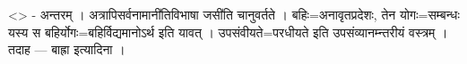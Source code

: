 \textless{}\textgreater{} - अन्तरम् । अत्रापिसर्वनामानी॑तिविभाषा जसी॑ति
चानुवर्तते । बहिः=अनावृतप्रदेशः, तेन योगः=सम्बन्धः यस्य स
बहिर्योगः=बहिर्विद्यमानोऽर्थ इति यावत् । उपसंवीयते=परधीयते इति
उपसंव्यानम्न्तरीयं वस्त्रम् । तदाह --- बाह्रा इत्यादिना ।
